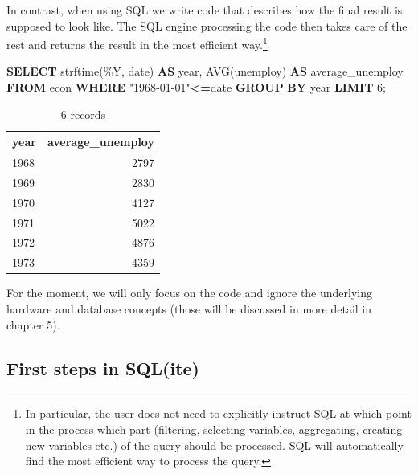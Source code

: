 \documentclass[
  12pt,
]{style/krantz}
\newenvironment{Shaded}{\begin{snugshade}}{\end{snugshade}}
\newcommand{\DataTypeTok}[1]{\textcolor[rgb]{0.13,0.29,0.53}{#1}}
\newcommand{\DecValTok}[1]{\textcolor[rgb]{0.00,0.00,0.81}{#1}}
\newcommand{\FunctionTok}[1]{\textcolor[rgb]{0.00,0.00,0.00}{#1}}
\newcommand{\KeywordTok}[1]{\textcolor[rgb]{0.13,0.29,0.53}{\textbf{#1}}}
\newcommand{\NormalTok}[1]{#1}
\newcommand{\OperatorTok}[1]{\textcolor[rgb]{0.81,0.36,0.00}{\textbf{#1}}}
\newcommand{\OtherTok}[1]{\textcolor[rgb]{0.56,0.35,0.01}{#1}}
\newcommand{\StringTok}[1]{\textcolor[rgb]{0.31,0.60,0.02}{#1}}
\begin{document}
In contrast, when using SQL we write code that describes how the final result is supposed to look like. The SQL engine processing the code then takes care of the rest and returns the result in the most efficient way.\footnote{In particular, the user does not need to explicitly instruct SQL at which point in the process which part (filtering, selecting variables, aggregating, creating new variables etc.) of the query should be processed. SQL will automatically find the most efficient way to process the query.}

\begin{Shaded}
\begin{Highlighting}[]
\KeywordTok{SELECT} 
\NormalTok{strftime(}\StringTok{\textquotesingle{}\%Y\textquotesingle{}}\NormalTok{, \textasciigrave{}date\textasciigrave{})  }\KeywordTok{AS} \DataTypeTok{year}\NormalTok{,}
\FunctionTok{AVG}\NormalTok{(unemploy) }\KeywordTok{AS}\NormalTok{ average\_unemploy}
\KeywordTok{FROM}\NormalTok{ econ}
\KeywordTok{WHERE} \OtherTok{"1968{-}01{-}01"}\OperatorTok{\textless{}=}\NormalTok{\textasciigrave{}date\textasciigrave{}}
\KeywordTok{GROUP} \KeywordTok{BY} \DataTypeTok{year} \KeywordTok{LIMIT} \DecValTok{6}\NormalTok{;}
\end{Highlighting}
\end{Shaded}

\begin{table}

\caption{\label{tab:unnamed-chunk-53}6 records}
\centering
\begin{tabular}[t]{l|r}
\hline
year & average\_unemploy\\
\hline
1968 & 2797\\
\hline
1969 & 2830\\
\hline
1970 & 4127\\
\hline
1971 & 5022\\
\hline
1972 & 4876\\
\hline
1973 & 4359\\
\hline
\end{tabular}
\end{table}

For the moment, we will only focus on the code and ignore the underlying hardware and database concepts (those will be discussed in more detail in chapter 5).

\hypertarget{first-steps-in-sqlite}{%
\subsection{First steps in SQL(ite)}\label{first-steps-in-sqlite}}
\end{document}
